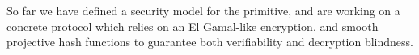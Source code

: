 \documentclass[11pt]{llncs}
\begin{document}
 So far we have defined a security model for the primitive, and are working on a concrete protocol which relies on an El Gamal-like encryption, and smooth projective hash functions to guarantee both verifiability and decryption blindness. %
 
 



		
\end{document}

